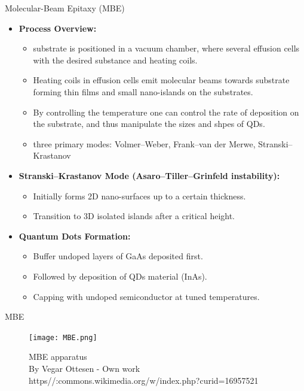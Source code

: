 \documentclass{beamer}
\begin{document}
\begin{frame}{Molecular-Beam Epitaxy (MBE)}
    \begin{itemize}
        \item \textbf{Process Overview:}
        \begin{itemize}
            \item substrate is positioned in a vacuum chamber, where several effusion cells with the desired substance and heating coils.
            \item Heating coils in effusion cells emit molecular beams towards substrate forming thin films and small nano-islands on the substrates.
            \item By controlling the temperature one can control the rate of deposition on the substrate, and thus manipulate the sizes and shpes of QDs. 
            \item  three primary modes: Volmer–Weber, Frank–van der Merwe, Stranski–Krastanov
        \end{itemize}
        \item \textbf{Stranski–Krastanov Mode (Asaro–Tiller–Grinfeld instability):}
        \begin{itemize}
            \item Initially forms 2D nano-surfaces up to a certain thickness.
            \item Transition to 3D isolated islands after a critical height.
        \end{itemize}
        \item \textbf{Quantum Dots Formation:}
        \begin{itemize}
            \item Buffer undoped layers of GaAs deposited first.
            \item Followed by deposition of QDs material (InAs).
            \item Capping with undoped semiconductor at tuned temperatures.
        \end{itemize}
    \end{itemize}
\end{frame}


\begin{frame}{MBE}
   \begin{figure}[h]
        \centering
        \texttt{[image: MBE.png]}
        \caption{\tiny{MBE apparatus}\\ \tiny{By Vegar Ottesen - Own work https//:commons.wikimedia.org/w/index.php?curid=16957521}}
        \label{MBE apparatus}
    \end{figure}
\end{frame}
\end{document}
